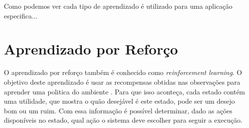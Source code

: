 Como podemos ver cada tipo de aprendizado é utilizado para uma aplicação especifica...

\section{Aprendizado por Reforço}

O aprendizado por reforço também é conhecido como \textit{reinforcement learning}. O objetivo deste aprendizado é usar as recompensas obtidas nas observações para aprender uma politica do ambiente \cite{intelligence2003modern}. Para que isso aconteça, cada estado contém uma utilidade, que mostra o quão desejável é este estado, pode ser um desejo bom ou um ruim. Com essa informação é possível determinar, dado as ações disponíveis no estado, qual ação o sistema deve escolher para seguir a execução. 

